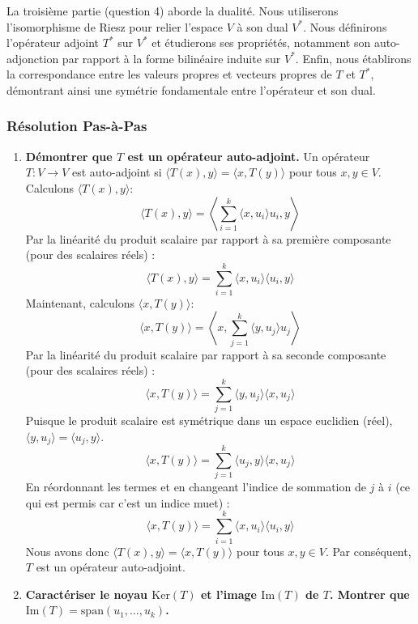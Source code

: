 \documentclass[11pt,a4paper]{report}
\begin{document}
La troisième partie (question 4) aborde la dualité. Nous utiliserons
l'isomorphisme de Riesz pour relier l'espace \(V\) à son dual \(V^*\).
Nous définirons l'opérateur adjoint \(T^*\) sur \(V^*\) et étudierons
ses propriétés, notamment son auto-adjonction par rapport à la forme
bilinéaire induite sur \(V^*\). Enfin, nous établirons la correspondance
entre les valeurs propres et vecteurs propres de \(T\) et \(T^*\),
démontrant ainsi une symétrie fondamentale entre l'opérateur et son
dual.

\hypertarget{ruxe9solution-pas-uxe0-pas}{%
\subsubsection{Résolution Pas-à-Pas}\label{ruxe9solution-pas-uxe0-pas}}

\begin{enumerate}
\def\labelenumi{\arabic{enumi}.}
\item
  \textbf{Démontrer que \(T\) est un opérateur auto-adjoint.} Un
  opérateur \(T: V \to V\) est auto-adjoint si
  \(\langle T(x), y \rangle = \langle x, T(y) \rangle\) pour tous
  \(x, y \in V\). Calculons \(\langle T(x), y \rangle\):
  \[ \langle T(x), y \rangle = \left\langle \sum_{i=1}^k \langle x, u_i \rangle u_i, y \right\rangle \]
  Par la linéarité du produit scalaire par rapport à sa première
  composante (pour des scalaires réels) :
  \[ \langle T(x), y \rangle = \sum_{i=1}^k \langle x, u_i \rangle \langle u_i, y \rangle \]
  Maintenant, calculons \(\langle x, T(y) \rangle\):
  \[ \langle x, T(y) \rangle = \left\langle x, \sum_{j=1}^k \langle y, u_j \rangle u_j \right\rangle \]
  Par la linéarité du produit scalaire par rapport à sa seconde
  composante (pour des scalaires réels) :
  \[ \langle x, T(y) \rangle = \sum_{j=1}^k \langle y, u_j \rangle \langle x, u_j \rangle \]
  Puisque le produit scalaire est symétrique dans un espace euclidien
  (réel), \(\langle y, u_j \rangle = \langle u_j, y \rangle\).
  \[ \langle x, T(y) \rangle = \sum_{j=1}^k \langle u_j, y \rangle \langle x, u_j \rangle \]
  En réordonnant les termes et en changeant l'indice de sommation de
  \(j\) à \(i\) (ce qui est permis car c'est un indice muet) :
  \[ \langle x, T(y) \rangle = \sum_{i=1}^k \langle x, u_i \rangle \langle u_i, y \rangle \]
  Nous avons donc \(\langle T(x), y \rangle = \langle x, T(y) \rangle\)
  pour tous \(x, y \in V\). Par conséquent, \(T\) est un opérateur
  auto-adjoint.
\item
  \textbf{Caractériser le noyau \(\text{Ker}(T)\) et l'image
  \(\text{Im}(T)\) de \(T\). Montrer que
  \(\text{Im}(T) = \text{span}(u_1, \dots, u_k)\).}


\end{enumerate}
\end{document}

